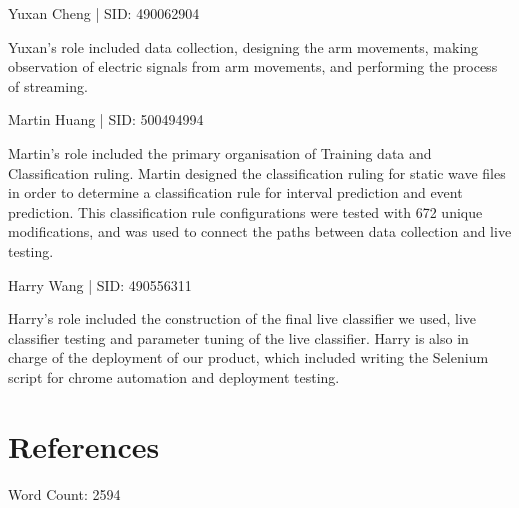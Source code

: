 \documentclass[oneside]{article}
\begin{document}
Yuxan Cheng | SID: 490062904

Yuxan's role included data collection, designing the arm movements, making observation of electric signals from arm movements, and performing the process of streaming.

Martin Huang | SID: 500494994

Martin's role included the primary organisation of Training data and Classification ruling. Martin designed the classification ruling for static wave files in order to determine a classification rule for interval prediction and event prediction. This classification rule configurations were tested with 672 unique modifications, and was used to connect the paths between data collection and live testing.

Harry Wang | SID: 490556311

Harry's role included the construction of the final live classifier we used, live classifier testing and parameter tuning of the live classifier. Harry is also in charge of the deployment of our product, which included writing the Selenium script for chrome automation and deployment testing.

\newpage
\section{References}

\nocite{*}






Word Count: 2594
\end{document}
